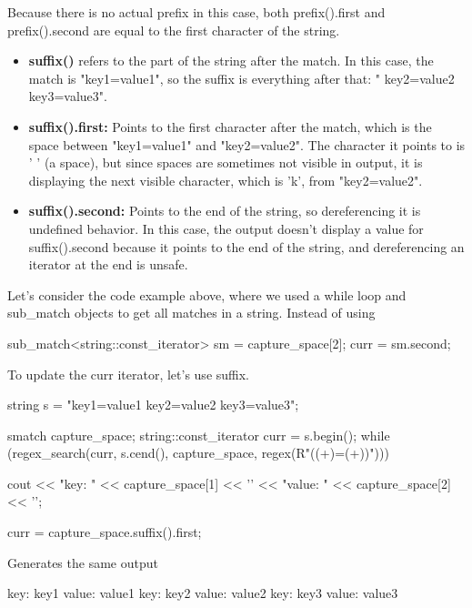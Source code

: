 \documentclass{report}
\begin{document}
    Because there is no actual prefix in this case, both prefix().first and prefix().second are equal to the first character of the string.
    \begin{itemize}
        \item \textbf{suffix()} refers to the part of the string after the match. In this case, the match is "key1=value1", so the suffix is everything after that: " key2=value2 key3=value3".
        \item \textbf{suffix().first:} Points to the first character after the match, which is the space between "key1=value1" and "key2=value2". The character it points to is ' ' (a space), but since spaces are sometimes not visible in output, it is displaying the next visible character, which is 'k', from "key2=value2".
        \item \textbf{suffix().second:} Points to the end of the string, so dereferencing it is undefined behavior. In this case, the output doesn't display a value for suffix().second because it points to the end of the string, and dereferencing an iterator at the end is unsafe.
    \end{itemize}
    \bigbreak \noindent 
    Let's consider the code example above, where we used a while loop and sub\_match objects to get all matches in a string. Instead of using
    \bigbreak \noindent 
    \begin{cppcode}
    sub_match<string::const_iterator> sm = capture_space[2];
    curr = sm.second;
    \end{cppcode}
    \bigbreak \noindent 
    To update the curr iterator, let's use suffix.
    \bigbreak \noindent 
    \begin{cppcode}
        string s = "key1=value1 key2=value2 key3=value3";

        smatch capture_space;
        string::const_iterator curr = s.begin();
        while (regex_search(curr, s.cend(), capture_space, regex(R"(\s*(\w+)=(\w+)\s*)"))) {
            cout << "key: " << capture_space[1] << '\n' << "value: " << capture_space[2] << '\n';

            curr = capture_space.suffix().first;
        }
    \end{cppcode}
    \bigbreak \noindent 
    Generates the same output
    \bigbreak \noindent 
    \begin{cppcode}
        key: key1
        value: value1
        key: key2
        value: value2
        key: key3
        value: value3
    \end{cppcode}
\end{document}
